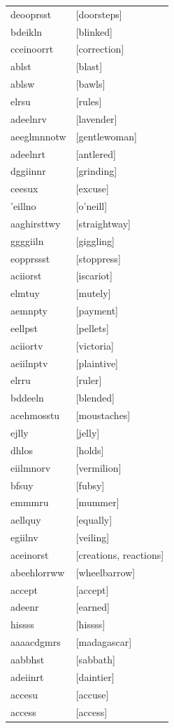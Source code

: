 \documentclass{article}
\begin{document}
\begin{tabular}{ll}
deooprsst & [doorsteps] \\
bdeikln & [blinked] \\
cceinoorrt & [correction] \\
ablst & [blast] \\
ablsw & [bawls] \\
elrsu & [rules] \\
adeelnrv & [lavender] \\
aeeglmnnotw & [gentlewoman] \\
adeelnrt & [antlered] \\
dggiinnr & [grinding] \\
ceesux & [excuse] \\
'eillno & [o'neill] \\
aaghirsttwy & [straightway] \\
ggggiiln & [giggling] \\
eopprssst & [stoppress] \\
aciiorst & [iscariot] \\
elmtuy & [mutely] \\
aemnpty & [payment] \\
eellpst & [pellets] \\
aciiortv & [victoria] \\
aeiilnptv & [plaintive] \\
elrru & [ruler] \\
bddeeln & [blended] \\
acehmosstu & [moustaches] \\
ejlly & [jelly] \\
dhlos & [holds] \\
eiilmnorv & [vermilion] \\
bfsuy & [fubsy] \\
emmmru & [mummer] \\
aellquy & [equally] \\
egiilnv & [veiling] \\
aceinorst & [creations, reactions] \\
abeehlorrww & [wheelbarrow] \\
accept & [accept] \\
adeenr & [earned] \\
hissss & [hissss] \\
aaaacdgmrs & [madagascar] \\
aabbhst & [sabbath] \\
adeiinrt & [daintier] \\
accesu & [accuse] \\
access & [access] \\

\end{tabular}
\end{document}
